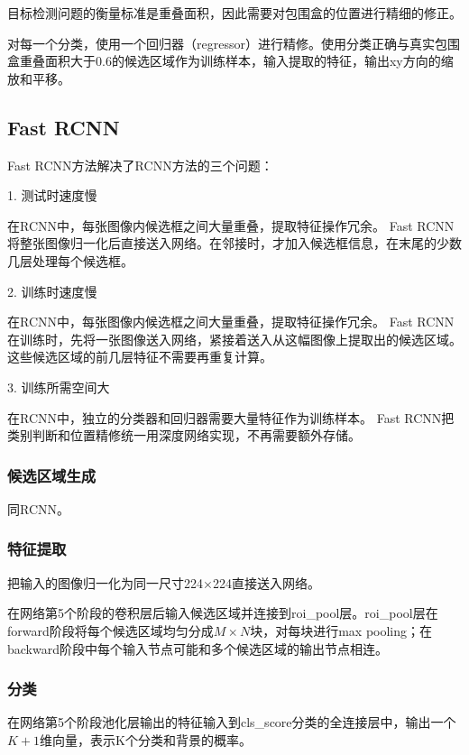 \documentclass[a4paper, 12pt, UTF8]{article}
\begin{document}
目标检测问题的衡量标准是重叠面积，因此需要对包围盒的位置进行精细的修正。

对每一个分类，使用一个回归器（regressor）进行精修。使用分类正确与真实包围盒重叠面积大于0.6的候选区域作为训练样本，输入提取的特征，输出xy方向的缩放和平移。


\subsection{Fast RCNN}

Fast RCNN方法解决了RCNN方法的三个问题：

1. 测试时速度慢

在RCNN中，每张图像内候选框之间大量重叠，提取特征操作冗余。
Fast RCNN将整张图像归一化后直接送入网络。在邻接时，才加入候选框信息，在末尾的少数几层处理每个候选框。

2. 训练时速度慢

在RCNN中，每张图像内候选框之间大量重叠，提取特征操作冗余。
Fast RCNN在训练时，先将一张图像送入网络，紧接着送入从这幅图像上提取出的候选区域。这些候选区域的前几层特征不需要再重复计算。

3. 训练所需空间大

在RCNN中，独立的分类器和回归器需要大量特征作为训练样本。
Fast RCNN把类别判断和位置精修统一用深度网络实现，不再需要额外存储。

\subsubsection{候选区域生成}

同RCNN。

\subsubsection{特征提取}

把输入的图像归一化为同一尺寸224×224直接送入网络。

在网络第5个阶段的卷积层后输入候选区域并连接到roi\_pool层。roi\_pool层在forward阶段将每个候选区域均匀分成$M \times N$块，对每块进行max pooling；在backward阶段中每个输入节点可能和多个候选区域的输出节点相连。

\subsubsection{分类}

在网络第5个阶段池化层输出的特征输入到cls\_score分类的全连接层中，输出一个$K + 1$维向量，表示K个分类和背景的概率。
\end{document}
